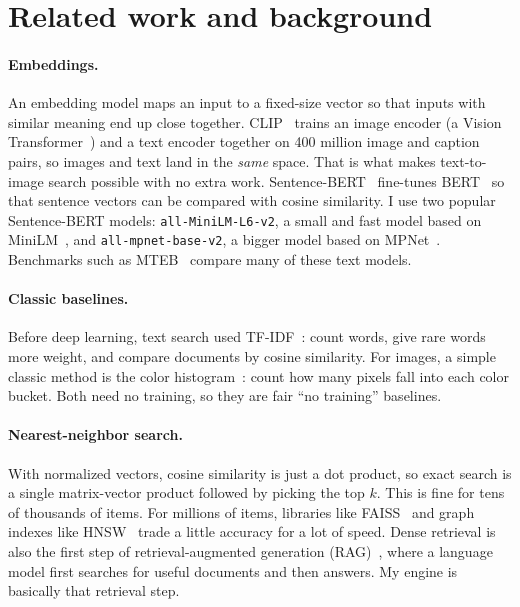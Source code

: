 \documentclass{article}
\begin{document}
\section{Related work and background}

\paragraph{Embeddings.} An embedding model maps an input to a fixed-size vector so that inputs with similar meaning end up close together. CLIP~\cite{radford2021clip} trains an image encoder (a Vision Transformer~\cite{dosovitskiy2021vit}) and a text encoder together on 400 million image and caption pairs, so images and text land in the \emph{same} space. That is what makes text-to-image search possible with no extra work. Sentence-BERT~\cite{reimers2019sbert} fine-tunes BERT~\cite{devlin2019bert} so that sentence vectors can be compared with cosine similarity. I use two popular Sentence-BERT models: \texttt{all-MiniLM-L6-v2}, a small and fast model based on MiniLM~\cite{wang2020minilm}, and \texttt{all-mpnet-base-v2}, a bigger model based on MPNet~\cite{song2020mpnet}. Benchmarks such as MTEB~\cite{muennighoff2023mteb} compare many of these text models.

\paragraph{Classic baselines.} Before deep learning, text search used TF-IDF~\cite{salton1988tfidf}: count words, give rare words more weight, and compare documents by cosine similarity. For images, a simple classic method is the color histogram~\cite{swain1991color}: count how many pixels fall into each color bucket. Both need no training, so they are fair ``no training'' baselines.

\paragraph{Nearest-neighbor search.} With normalized vectors, cosine similarity is just a dot product, so exact search is a single matrix-vector product followed by picking the top $k$. This is fine for tens of thousands of items. For millions of items, libraries like FAISS~\cite{johnson2019faiss} and graph indexes like HNSW~\cite{malkov2020hnsw} trade a little accuracy for a lot of speed. Dense retrieval is also the first step of retrieval-augmented generation (RAG)~\cite{lewis2020rag,karpukhin2020dpr}, where a language model first searches for useful documents and then answers. My engine is basically that retrieval step.
\end{document}
